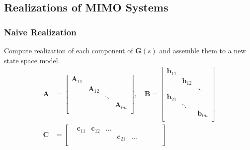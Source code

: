 \subsection{Realizations of MIMO Systems}
\subsubsection{Naive Realization}
Compute realization of each component of $\mathbf{G}(s)$ and assemble them to a new state space model.
\begin{align*}
    \mathbf{A} & =\begin{bmatrix}
                      \mathbf{A}_{11} &                 &        &                 \\
                                      & \mathbf{A}_{12} &        &                 \\
                                      &                 & \ddots &                 \\
                                      &                 &        & \mathbf{A}_{lm} \\
                  \end{bmatrix},
    \quad \mathbf{B}  =\begin{bmatrix}
                           \mathbf{b}_{11} &                 &                 \\
                                           & \mathbf{b}_{12} &                 \\
                                           &                 & \ddots          \\
                           \mathbf{b}_{21} &                 &                 \\
                                           & \ddots          &                 \\
                                           &                 & \mathbf{b}_{lm} \\
                       \end{bmatrix}                                                                    \\
    \mathbf{C} & =\begin{bmatrix}
                       & \mathbf{c}_{11} & \mathbf{c}_{12} & \dots &                 &       &        &                 &       &                 \\
                       &                 &                 &       & \mathbf{c}_{21} & \dots &        &                 &       &                 \\

\end{bmatrix}
\end{align*}
